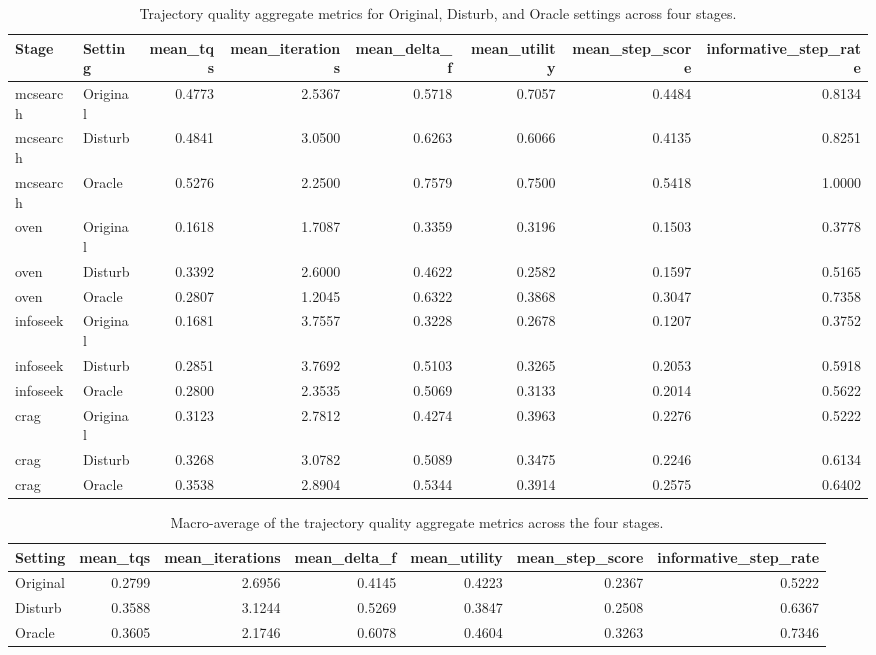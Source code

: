 \begin{table}[t]
\centering
\small
\setlength{\tabcolsep}{5pt}
\begin{tabular}{llrrrrrr}
\hline
Stage & Setting & mean\_tqs & mean\_iterations & mean\_delta\_f & mean\_utility & mean\_step\_score & informative\_step\_rate \\
\hline
mcsearch & Original & 0.4773 & 2.5367 & 0.5718 & 0.7057 & 0.4484 & 0.8134 \\
mcsearch & Disturb  & 0.4841 & 3.0500 & 0.6263 & 0.6066 & 0.4135 & 0.8251 \\
mcsearch & Oracle   & 0.5276 & 2.2500 & 0.7579 & 0.7500 & 0.5418 & 1.0000 \\
\hline
oven & Original & 0.1618 & 1.7087 & 0.3359 & 0.3196 & 0.1503 & 0.3778 \\
oven & Disturb  & 0.3392 & 2.6000 & 0.4622 & 0.2582 & 0.1597 & 0.5165 \\
oven & Oracle   & 0.2807 & 1.2045 & 0.6322 & 0.3868 & 0.3047 & 0.7358 \\
\hline
infoseek & Original & 0.1681 & 3.7557 & 0.3228 & 0.2678 & 0.1207 & 0.3752 \\
infoseek & Disturb  & 0.2851 & 3.7692 & 0.5103 & 0.3265 & 0.2053 & 0.5918 \\
infoseek & Oracle   & 0.2800 & 2.3535 & 0.5069 & 0.3133 & 0.2014 & 0.5622 \\
\hline
crag & Original & 0.3123 & 2.7812 & 0.4274 & 0.3963 & 0.2276 & 0.5222 \\
crag & Disturb  & 0.3268 & 3.0782 & 0.5089 & 0.3475 & 0.2246 & 0.6134 \\
crag & Oracle   & 0.3538 & 2.8904 & 0.5344 & 0.3914 & 0.2575 & 0.6402 \\
\hline
\end{tabular}
\caption{Trajectory quality aggregate metrics for Original, Disturb, and Oracle settings across four stages.}
\label{tab:refamb-trajectory-quality-stagewise}
\end{table}

\begin{table}[t]
\centering
\small
\setlength{\tabcolsep}{6pt}
\begin{tabular}{lrrrrrr}
\hline
Setting & mean\_tqs & mean\_iterations & mean\_delta\_f & mean\_utility & mean\_step\_score & informative\_step\_rate \\
\hline
Original & 0.2799 & 2.6956 & 0.4145 & 0.4223 & 0.2367 & 0.5222 \\
Disturb  & 0.3588 & 3.1244 & 0.5269 & 0.3847 & 0.2508 & 0.6367 \\
Oracle   & 0.3605 & 2.1746 & 0.6078 & 0.4604 & 0.3263 & 0.7346 \\
\hline
\end{tabular}
\caption{Macro-average of the trajectory quality aggregate metrics across the four stages.}
\label{tab:refamb-trajectory-quality-average}
\end{table}
